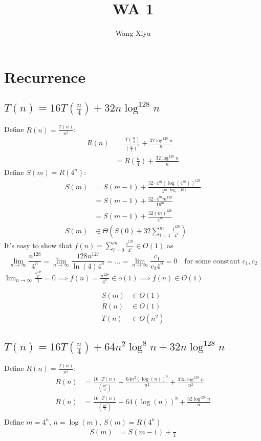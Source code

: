 \documentclass{article}
\begin{document}
\title{WA 1}
\author{Wang Xiyu}
\date{}
\maketitle

\section{Recurrence}

\subsection{$T(n) = 16T(\frac{n}{4}) + 32n\log^{128}n$}
Define $R(n) = \frac{T(n)}{n^2}$:
\begin{align*}
    R(n) &= \frac{T(\frac{n}{4})}{(\frac{n}{4})^2} + \frac{32\log^{128}n}{n}\\
    &= R(\frac{n}{4}) + \frac{32\log^{128}n}{n}
\end{align*}
Define $S(m) = R(4^n)$:
\begin{align*}
    S(m) &= S(m - 1) + \frac{32 \cdot 4^m (\log(4^m))^{128}}{4^{m \cdot \log_4(16)}}\\
    &= S(m -1) + \frac{32\cdot 4^m m^{128}}{16^m}\\
    &= S(m-1) + \frac{32(m)^{128}}{4^m}\\
    S(m) &\in \Theta(S(0) + 32\sum_{i=1}^{m} \frac{i^{128}}{4^i})
\end{align*}
It's easy to show that $f(n) = \sum_{i=0}^{m}\frac{i^{128}}{4^i} \in O(1)$ as 
\[\lim_{n\rightarrow \infty} \frac{n^{128}}{4^n} = \lim_{n\rightarrow \infty} \frac{128 n^{127}}{\ln(4) 4^n} 
= \dots = \lim_{n \rightarrow \infty} \frac{c_1 }{c_2 4^n} = 0\quad \text{for some constant } c_1, c_2\]
$\lim_{n \rightarrow \infty} \frac{\frac{n^{128}}{4^n}}{1} = 0 \implies f(n) = \frac{n^{128}}{4^n} \in o(1) \implies f(n) \in O(1)$

\begin{align*}
    S(m) &\in O(1)\\
    R(n) &\in O(1)\\
    T(n) &\in O(n^2)
\end{align*}
\subsection{$T(n) = 16T(\frac{n}{4}) + 64n^2 \log^8 n + 32n \log^{128} n$}
Define $R(n) = \frac{T(n)}{n^2}$:
\begin{align*}
    R(n) &= \frac{16\cdot T(n)}{(\frac{n^2}{4})} + \frac{64n^2(\log(n))^8}{n^2} + \frac{32n\log^{128}n}{n^2}\\
    R(n) &= \frac{16\cdot T(n)}{(\frac{n^2}{4})} + 64(\log(n))^8 + \frac{32\log^{128}n}{n}\\
\end{align*}
Define $m = 4^n$, $n = \log(m)$, $S(m) = R(4^n)$
\begin{align*}
    S(m) &= S(m - 1) + \frac{}{4^{}}
\end{align*}
\end{document}
